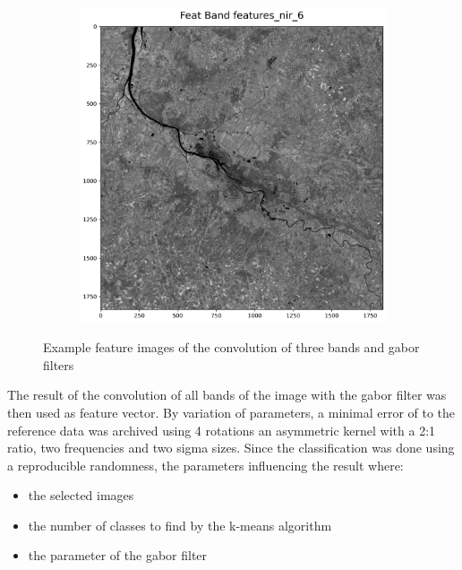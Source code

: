 \documentclass[12pt,a4paper, english,twoside]{article}
\begin{document}
\begin{figure}[!htbp]
\begin{subfigure}[b]{0.3\textwidth}
      \end{subfigure}
      \begin{subfigure}[b]{0.3\textwidth}
        \includegraphics[width=\textwidth]{img/Features_nir_6.png}
      \end{subfigure}
     \caption{Example feature images of the convolution of three bands and gabor filters\label{fig:gaborresults}}
    \end{figure}
 \noindent 
      The result of the convolution of all bands of the image with the gabor filter was then used as feature vector. 
      By variation of parameters, a minimal error of \todo[inline,size=\tiny]{ }
      to the reference data was archived using 4 rotations an asymmetric kernel with a 2:1 ratio, two frequencies and two sigma sizes.
      Since the classification was done using a reproducible randomness, the parameters influencing the result where:
      \begin{itemize}
        \item the selected images
        \item the number of classes to find by the k-means algorithm
        \item the parameter of the gabor filter
      \end{itemize}
\end{document}
